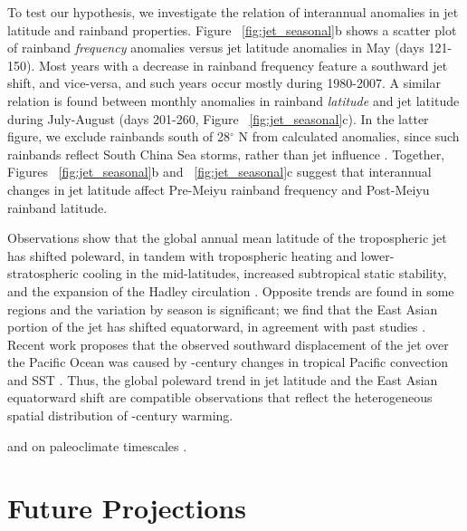 	To test our hypothesis, we investigate the relation of interannual anomalies in jet latitude and rainband properties. Figure ~\ref{fig:jet_seasonal}b shows a scatter plot of rainband \textit{frequency} anomalies versus jet latitude anomalies in May (days 121-150). Most years with a decrease in rainband frequency feature a southward jet shift, and vice-versa, and such years occur mostly during 1980-2007. A similar relation is found between monthly anomalies in rainband \textit{latitude} and jet latitude during July-August (days 201-260, Figure ~\ref{fig:jet_seasonal}c). In the latter figure, we exclude rainbands south of 28$^{\circ}$ N from calculated anomalies, since such rainbands reflect South China Sea storms, rather than jet influence \citep{Day2015}. Together, Figures ~\ref{fig:jet_seasonal}b and ~\ref{fig:jet_seasonal}c suggest that interannual changes in jet latitude affect Pre-Meiyu rainband frequency and Post-Meiyu rainband latitude.

	 Observations show that the global annual mean latitude of the tropospheric jet has shifted poleward, in tandem with tropospheric heating and lower-stratospheric cooling in the mid-latitudes, increased subtropical static stability, and the expansion of the Hadley circulation \citep{Fu2006,Archer2008,Fu2011}. Opposite trends are found in some regions and the variation by season is significant; we find that the East Asian portion of the jet has shifted equatorward, in agreement with past studies \citep{Yu2007, Archer2008}. Recent work proposes that the observed southward displacement of the jet over the Pacific Ocean was caused by -century changes in tropical Pacific convection and SST \citep{Park2014a}. Thus, the global poleward trend in jet latitude and the East Asian equatorward shift are compatible observations that reflect the heterogeneous spatial distribution of -century warming.
	 
	 	 
		 and on paleoclimate timescales \citep{Nagashima2011,Nagashima2013,Chiang2015}.
		 
\section{Future Projections}

